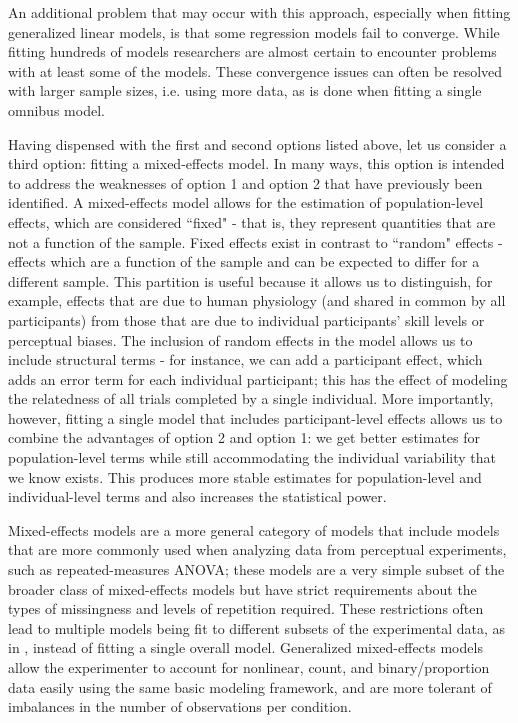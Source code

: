 An additional problem that may occur with this approach, especially when fitting generalized linear models, is that some regression models fail to converge. 
While fitting hundreds of models researchers are almost certain to encounter problems with at least some of the models. These convergence issues can often be resolved with larger sample sizes, i.e. using more data, as is done when fitting a single omnibus model.

Having dispensed with the first and second options listed above, let us consider a third option: fitting a mixed-effects model. 
In many ways, this option is intended to address the weaknesses of option 1 and option 2 that have previously been identified. 
A mixed-effects model allows for the estimation of population-level effects, which are considered ``fixed" - that is, they represent quantities that are not a function of the sample. 
Fixed effects exist in contrast to ``random" effects - effects which are a function of the sample and can be expected to differ for a different sample. 
This partition is useful because it allows us to distinguish, for example, effects that are due to human physiology (and shared in common by all participants) from those that are due to individual participants' skill levels or perceptual biases. 
The inclusion of random effects in the model allows us to include structural terms - for instance, we can add a participant effect, which adds an error term for each individual participant; this has the effect of modeling the relatedness of all trials completed by a single individual. 
More importantly, however, fitting a single model that includes participant-level effects allows us to combine the advantages of option 2 and option 1: we get better estimates for population-level terms while still accommodating the individual variability that we know exists. 
This produces more stable estimates for population-level and individual-level terms and also increases the statistical power. 

Mixed-effects models are a more general category of models that include models that are more commonly used when analyzing data from perceptual experiments, such as repeated-measures ANOVA; these models are a very simple subset of the broader class of mixed-effects models but have strict requirements about the types of missingness and levels of repetition required. 
These restrictions often lead to multiple models being fit to different subsets of the experimental data, as in \cite{saketEvaluatingInteractiveGraphical2018a}, instead of fitting a single overall model.
Generalized mixed-effects models allow the experimenter to account for nonlinear, count, and binary/proportion data easily using the same basic modeling framework, and are more tolerant of imbalances in the number of observations per condition. 

